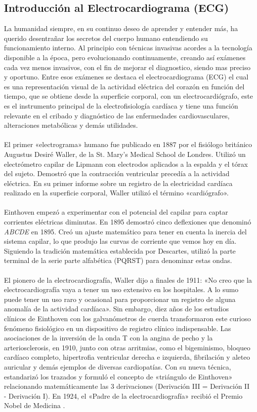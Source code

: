\documentclass[spanish,11pt,letterpaper,oneside]{memoir}
\begin{document}
\subsection{Introducción al Electrocardiograma (ECG)}
	La humanidad siempre, en su continuo deseo de aprender y entender más, ha querido desentrañar los secretos del cuerpo humano entendiendo su funcionamiento interno. Al principio con técnicas invasivas acordes a la tecnología disponible a la época, pero evolucionando continuamente, creando así exámenes cada vez menos invasivos, con el fin de mejorar el diagnostico, siendo mas preciso y oportuno. Entre esos exámenes se destaca el electrocardiograma (ECG) el cual es una representación visual de la actividad eléctrica del corazón en función del tiempo, que se obtiene desde la superficie corporal, con un electrocardiógrafo, este es el instrumento principal de la electrofisiología cardíaca y tiene una función relevante en el cribado y diagnóstico de las enfermedades cardiovasculares, alteraciones metabólicas y demás utilidades. \\
	\\
    El primer «electrograma» humano fue publicado en 1887 por el fisiólogo británico Augustus Desiré Waller, de la St. Mary's Medical School de Londres. Utilizó un electrómetro capilar de Lipmann con electrodos aplicados a la espalda y el tórax del sujeto. Demostró que la contracción ventricular precedía a la actividad eléctrica. En su primer informe sobre un registro de la electricidad cardíaca realizado en la superficie corporal, Waller utilizó el término «cardiógrafo».  \\
    \\
    Einthoven empezó a experimentar con el potencial del capilar para captar corrientes eléctricas diminutas. En 1895 demostró cinco deflexiones que denominó \textit{ABCDE} en 1895. Creó un ajuste matemático para tener en cuenta la inercia del sistema capilar, lo que produjo las curvas de corriente que vemos hoy en día. Siguiendo la tradición matemática establecida por Descartes, utilizó la parte terminal de la serie parte alfabética (PQRST) para denominar estas ondas. \\
    \\
    El pionero de la electrocardiografía, Waller dijo a finales de 1911: «No creo que la electrocardiografía vaya a tener un uso extensivo en los hospitales. A lo sumo puede tener un uso raro y ocasional para proporcionar un registro de alguna anomalía de la actividad cardíaca». Sin embargo, diez años de los estudios clínicos de Einthoven con los galvanómetros de cuerda transformaron este curioso fenómeno fisiológico en un dispositivo de registro clínico indispensable. Las asociaciones de la inversión de la onda T con la angina de pecho y la arteriosclerosis, en 1910, junto con otras arritmias, como el bigeminismo, bloqueo cardíaco completo, hipertrofia ventricular derecha e izquierda, fibrilación y aleteo auricular y demás ejemplos de diversas cardiopatías. Con su nueva técnica, estandarizó los trazados y formuló el concepto de «triángulo de Einthoven» relacionando matemáticamente las 3 derivaciones (Derivación III = Derivación II - Derivación I). En 1924, el «Padre de la electrocardiografía» recibió el Premio Nobel de Medicina \cite{vincent2022}.\\
\end{document}
